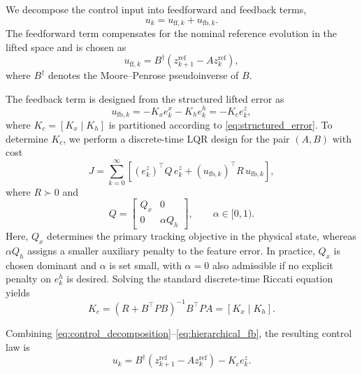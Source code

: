 \documentclass[journal]{IEEEtran}
\begin{document}
We decompose the control input into feedforward and feedback terms,
\begin{equation}
    u_k = u_{\mathrm{ff},k} + u_{\mathrm{fb},k}.
    \label{eq:control_decomposition}
\end{equation}
The feedforward term compensates for the nominal reference evolution in the lifted space and is chosen as
\begin{equation}
    u_{\mathrm{ff},k}
    =
    B^\dagger \!\left(z_{k+1}^{\mathrm{ref}} - A z_k^{\mathrm{ref}}\right),
    \label{eq:feedforward}
\end{equation}
where $B^\dagger$ denotes the Moore--Penrose pseudoinverse of $B$.

The feedback term is designed from the structured lifted error as
\begin{equation}
    u_{\mathrm{fb},k}
    =
    -K_x e_k^x - K_h e_k^h
    =
    -K_c e_k^z,
    \label{eq:hierarchical_fb}
\end{equation}
where $K_c = [K_x\;|\;K_h]$ is partitioned according to \eqref{eq:structured_error}. To determine $K_c$, we perform a discrete-time LQR design for the pair $(A,B)$ with cost
\begin{equation}
    J = \sum_{k=0}^{\infty}
    \left[
        (e_k^z)^\top Q\,e_k^z
        +
        (u_{\mathrm{fb},k})^\top R\,u_{\mathrm{fb},k}
    \right],
    \label{eq:lqr_objective}
\end{equation}
where $R \succ 0$ and
\begin{equation}
    Q =
    \begin{bmatrix}
        Q_x & 0 \\
        0 & \alpha Q_h
    \end{bmatrix},
    \qquad \alpha \in [0,1).
    \label{eq:block_diag_Q}
\end{equation}
Here, $Q_x$ determines the primary tracking objective in the physical state, whereas $\alpha Q_h$ assigns a smaller auxiliary penalty to the feature error. In practice, $Q_x$ is chosen dominant and $\alpha$ is set small, with $\alpha = 0$ also admissible if no explicit penalty on $e_k^h$ is desired. Solving the standard discrete-time Riccati equation yields
\begin{equation}
    K_c
    =
    (R + B^\top P B)^{-1} B^\top P A
    =
    [K_x\;|\;K_h].
    \label{eq:lqr_gain}
\end{equation}

Combining \eqref{eq:control_decomposition}--\eqref{eq:hierarchical_fb}, the resulting control law is
\begin{equation}
    u_k
    =
    B^\dagger \!\left(z_{k+1}^{\mathrm{ref}} - A z_k^{\mathrm{ref}}\right)
    - K_c e_k^z.
    \label{eq:full_ctrl}
\end{equation}
\end{document}
